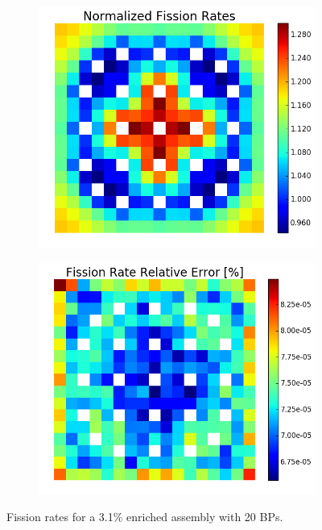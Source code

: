 \begin{figure}[h!]
\centering
\begin{subfigure}{0.44\textwidth}
  \centering
  \includegraphics[width=\linewidth]{figures/benchmarks/fission-rates/fiss-mean-fuel-31-20BAs}
  \caption{}
  \label{fig:chap7-fiss-rate-mean-3.1-20BAs-assm}
\end{subfigure}%
\begin{subfigure}{0.44\textwidth}
  \centering
  \includegraphics[width=\linewidth]{figures/benchmarks/fission-rates/fiss-rel-err-fuel-31-20BAs}
  \caption{}
  \label{fig:chap7-fiss-rate-rel-err-3.1-20BAs-assm}
\end{subfigure}%
\caption[Fission rates for a 3.1\% enriched assembly with 20 BPs]{Fission rates for a 3.1\% enriched assembly with 20 \ac{BP}s.}
\label{fig:chap7-fiss-rates-3.1-assm-20BAs}
\end{figure}

